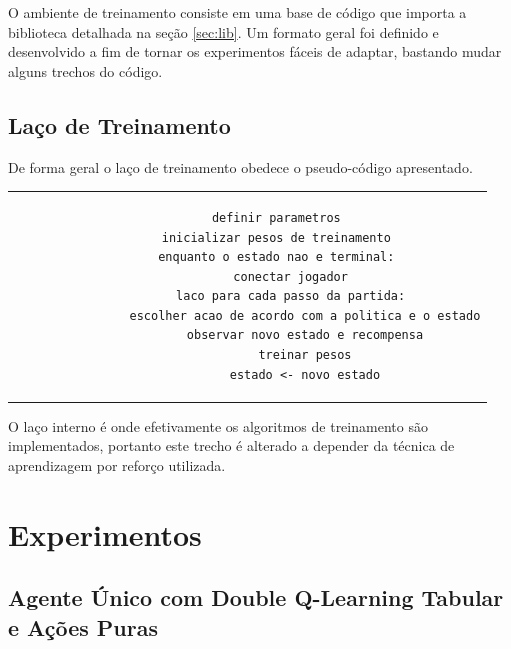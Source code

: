 O ambiente de treinamento consiste em uma base de código que importa a biblioteca detalhada na seção \ref{sec:lib}. Um formato geral foi definido e desenvolvido a fim de tornar os experimentos fáceis de adaptar, bastando mudar alguns trechos do código.

\subsection{Laço de Treinamento}

De forma geral o laço de treinamento obedece o pseudo-código apresentado.

\begin{tabular}{c}
	\begin{lstlisting}
		definir parametros
		inicializar pesos de treinamento
		enquanto o estado nao e terminal:
			conectar jogador
			laco para cada passo da partida:
				escolher acao de acordo com a politica e o estado
				observar novo estado e recompensa
				treinar pesos
				estado <- novo estado
	\end{lstlisting}
\end{tabular}

O laço interno é onde efetivamente os algoritmos de treinamento são implementados, portanto este trecho é alterado a depender da técnica de aprendizagem por reforço utilizada.

\section{Experimentos}


\subsection{Agente Único com Double Q-Learning Tabular e Ações Puras}



